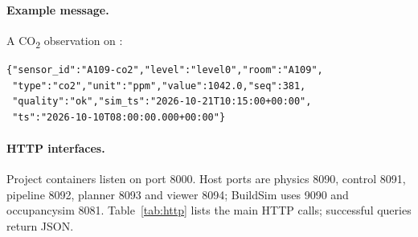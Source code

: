 \documentclass[11pt,a4paper]{article}
\begin{document}
\paragraph{Example message.}
A CO\textsubscript{2} observation on \protect{}:
{\small\begin{verbatim}
{"sensor_id":"A109-co2","level":"level0","room":"A109",
 "type":"co2","unit":"ppm","value":1042.0,"seq":381,
 "quality":"ok","sim_ts":"2026-10-21T10:15:00+00:00",
 "ts":"2026-10-10T08:00:00.000+00:00"}
\end{verbatim}}

\paragraph{HTTP interfaces.}
Project containers listen on port 8000. Host ports are physics 8090, control 8091, pipeline 8092, planner 8093 and viewer 8094; BuildSim uses 9090 and occupancysim 8081. Table~\ref{tab:http} lists the main HTTP calls; successful queries return JSON.
\end{document}
